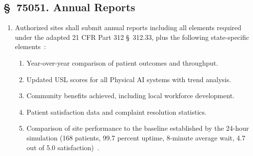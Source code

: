 \subsection{\S~75051. Annual Reports}

\begin{enumerate}[label=(\alph*)]
\item Authorized sites shall submit annual reports including all elements
  required under the adapted 21 CFR Part 312 \S~312.33, plus the following
  state-specific elements~\cite{cfr312adapt}:
  \begin{enumerate}[label=(\arabic*)]
  \item Year-over-year comparison of patient outcomes and throughput.
  \item Updated USL scores for all Physical AI systems with trend analysis.
  \item Community benefits achieved, including local workforce development.
  \item Patient satisfaction data and complaint resolution statistics.
  \item Comparison of site performance to the baseline established by the
    24-hour simulation (168 patients, 99.7 percent uptime, 8-minute average
    wait, 4.7 out of 5.0 satisfaction)~\cite{newtrial2026}.
  \end{enumerate}
\end{enumerate}

